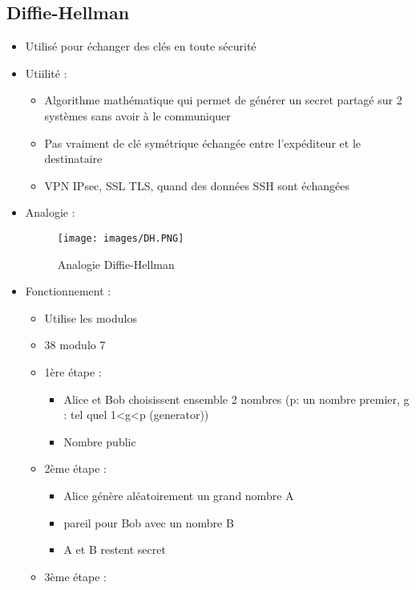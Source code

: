 \documentclass[a4paper]{article}
\begin{document}
\subsection{Diffie-Hellman}
\begin{itemize}[label=\textbullet, font=\Large]
    \item Utilisé pour échanger des clés en toute sécurité
    \item Utiilité :
    \begin{itemize}[label=, font=\scriptsize]
        \item Algorithme mathématique qui permet de générer un secret partagé sur 2 systèmes sans avoir à le communiquer
        \item Pas vraiment de clé symétrique échangée entre l'expéditeur et le destinataire
        \item VPN IPsec, SSL TLS, quand des données SSH sont échangées
    \end{itemize}
    \item Analogie :
    \begin{figure}[H]
        \centering
        \texttt{[image: images/DH.PNG]}
        \caption{Analogie Diffie-Hellman}
    \end{figure}
    \item Fonctionnement :
    \begin{itemize}[label=, font=\scriptsize]
        \item Utilise les modulos
        \item 38 modulo 7
        \item 1ère étape :
        \begin{itemize}
            \item Alice et Bob choisissent ensemble 2 nombres (p: un nombre premier, g : tel quel 1<g<p (generator))
            \item Nombre public
        \end{itemize}
        \item 2ème étape :
        \begin{itemize}
            \item Alice génère aléatoirement un grand nombre A
            \item pareil pour Bob avec un nombre B
            \item A et B restent secret
        \end{itemize}
        \item 3ème étape :
        \begin{itemize}

\end{itemize}
\end{itemize}
\end{itemize}
\end{document}
